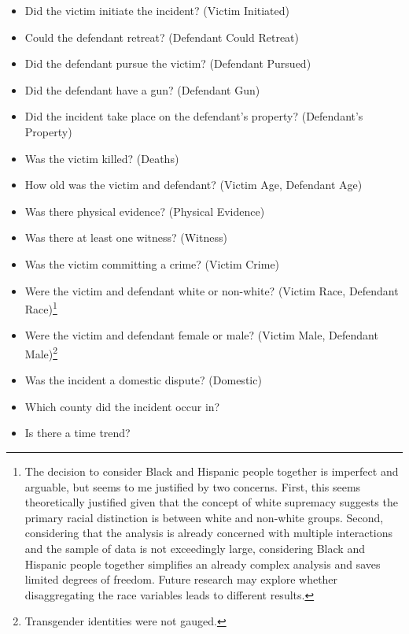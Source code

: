 \documentclass[12pt,article]{article}
\begin{document}
\begin{itemize}
\itemsep1pt\parskip0pt
\item
  Did the victim initiate the incident? (Victim Initiated)
\item
  Could the defendant retreat? (Defendant Could Retreat)
\item
  Did the defendant pursue the victim? (Defendant Pursued)
\item
  Did the defendant have a gun? (Defendant Gun)
\item
  Did the incident take place on the defendant's property? (Defendant's
  Property)
\item
  Was the victim killed? (Deaths)
\item
  How old was the victim and defendant? (Victim Age, Defendant Age)
\item
  Was there physical evidence? (Physical Evidence)
\item
  Was there at least one witness? (Witness)
\item
  Was the victim committing a crime? (Victim Crime)
\item
  Were the victim and defendant white or non-white? (Victim Race,
  Defendant Race)\footnote{The decision to consider Black and Hispanic
    people together is imperfect and arguable, but seems to me justified
    by two concerns. First, this seems theoretically justified given
    that the concept of white supremacy suggests the primary racial
    distinction is between white and non-white groups. Second,
    considering that the analysis is already concerned with multiple
    interactions and the sample of data is not exceedingly large,
    considering Black and Hispanic people together simplifies an already
    complex analysis and saves limited degrees of freedom. Future
    research may explore whether disaggregating the race variables leads
    to different results.}
\item
  Were the victim and defendant female or male? (Victim Male, Defendant
  Male)\footnote{Transgender identities were not gauged.}
\item
  Was the incident a domestic dispute? (Domestic)
\item
  Which county did the incident occur in?
\item
  Is there a time trend?
\end{itemize}
\end{document}
